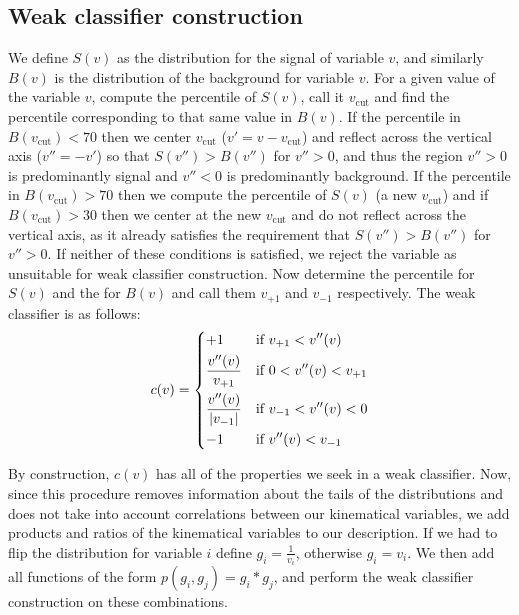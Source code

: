 \subsection{Weak classifier construction}
 We define $S(v)$ as the distribution for the signal of variable $v$, and similarly $B(v)$ is the distribution of the background for variable $v$. For a given value of the variable $v$, compute the  percentile of $S(v)$, call it $v_{\text{cut}}$ and find the percentile corresponding to that same value in $B(v)$. If the percentile in $B(v_{\text{cut}})<70$ then we center $v_{\text{cut}}$ ($v'=v-v_{\text{cut}}$) and reflect across the vertical axis ($v''=-v'$) so that $S(v'')>B(v'')$ for $v''>0$, and thus the region $v''>0$ is predominantly signal and $v''<0$ is predominantly background. If the percentile in $B(v_{\text{cut}})>70$ then we compute the  percentile of $S(v)$ (a new $v_{\text{cut}}$) and if $B(v_{\text{cut}})>30$ then we center at the new $v_{\text{cut}}$ and do not reflect across the  vertical axis, as it already satisfies the requirement that $S(v'')>B(v'')$ for $v''>0$. If neither of these conditions is satisfied, we reject the variable as unsuitable for weak classifier construction. Now determine the  percentile for $S(v)$ and the  for $B(v)$ and call them $v_{+1}$ and $v_{-1}$ respectively. The weak classifier is as follows:
 		\begin{equation}
		c(v) =
 		\begin{dcases}
 			+1 & \text{if } v_{+1} < v''(v) \\
 			\frac{v''(v)}{v_{+1}} & \text{if } 0<v''(v)<v_{+1} \\
 			\frac{v''(v)}{\abs{v_{-1}}} & \text{if } v_{-1} < v''(v) < 0 \\
 			-1 & \text{if } v''(v) < v_{-1}
 		\end{dcases}
 		 \end{equation}

 By construction, $c(v)$ has all of the properties we seek in a weak classifier. Now, since this procedure removes information about the tails of the distributions and does not take into account correlations between our kinematical variables, we add products and ratios of the kinematical variables to our description. If we had to flip the distribution for variable $i$ define $g_i = \frac{1}{v_i}$, otherwise $g_i=v_i$. We then add all functions of the form $p(g_i,g_j) = g_i*g_j$, and perform the weak classifier construction on these combinations.

